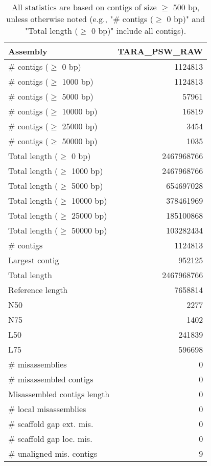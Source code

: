 \documentclass[12pt,a4paper]{article}
\begin{document}
\begin{table}[ht]
\begin{center}
\caption{All statistics are based on contigs of size $\geq$ 500 bp, unless otherwise noted (e.g., "\# contigs ($\geq$ 0 bp)" and "Total length ($\geq$ 0 bp)" include all contigs).}
\begin{tabular}{|l*{1}{|r}|}
\hline
Assembly & TARA\_PSW\_RAW \\ \hline
\# contigs ($\geq$ 0 bp) & 1124813 \\ \hline
\# contigs ($\geq$ 1000 bp) & 1124813 \\ \hline
\# contigs ($\geq$ 5000 bp) & 57961 \\ \hline
\# contigs ($\geq$ 10000 bp) & 16819 \\ \hline
\# contigs ($\geq$ 25000 bp) & 3454 \\ \hline
\# contigs ($\geq$ 50000 bp) & 1035 \\ \hline
Total length ($\geq$ 0 bp) & 2467968766 \\ \hline
Total length ($\geq$ 1000 bp) & 2467968766 \\ \hline
Total length ($\geq$ 5000 bp) & 654697028 \\ \hline
Total length ($\geq$ 10000 bp) & 378461969 \\ \hline
Total length ($\geq$ 25000 bp) & 185100868 \\ \hline
Total length ($\geq$ 50000 bp) & 103282434 \\ \hline
\# contigs & 1124813 \\ \hline
Largest contig & 952125 \\ \hline
Total length & 2467968766 \\ \hline
Reference length & 7658814 \\ \hline
N50 & 2277 \\ \hline
N75 & 1402 \\ \hline
L50 & 241839 \\ \hline
L75 & 596698 \\ \hline
\# misassemblies & 0 \\ \hline
\# misassembled contigs & 0 \\ \hline
Misassembled contigs length & 0 \\ \hline
\# local misassemblies & 0 \\ \hline
\# scaffold gap ext. mis. & 0 \\ \hline
\# scaffold gap loc. mis. & 0 \\ \hline
\# unaligned mis. contigs & 9 \\ \hline

\end{tabular}
\end{center}
\end{table}
\end{document}
